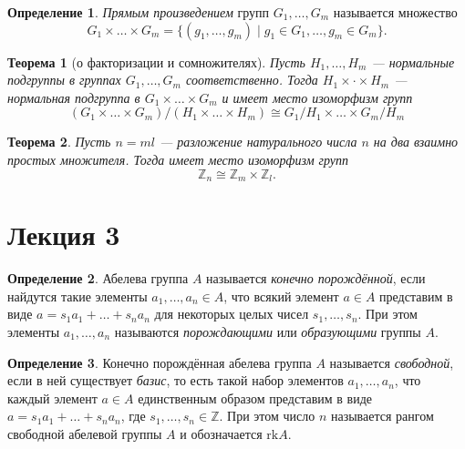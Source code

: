 \documentclass[a4paper]{article}
\theoremstyle{plain}
\newtheorem*{theorem}{Теорема}
\theoremstyle{definition}
\newtheorem{definition}{Определение}
\numberwithin{definition}{section}
\numberwithin{proposal}{section}
\newcommand{\rk}{\mathrm{rk}}
\begin{document}
\begin{definition}
\emph{Прямым произведением} групп \(G_1, \dots, G_m\) называется множество
\begin{equation*}
	G_1 \times \dots \times G_m = \{(g_1, \dots, g_m) \;|\; g_1 \in G_1, \dots, g_m \in G_m\}.
\end{equation*}
\end{definition}

\begin{theorem}[о факторизации и сомножителях]
Пусть \(H_1, \dots, H_m\) --- нормальные подгруппы в группах \(G_1, \dots, G_m\) соответственно. Тогда \(H_1 \times \cdot \times H_m\) --- нормальная подгруппа в \(G_1 \times \dots \times G_m\) и имеет место изоморфизм групп
\begin{equation*}
	(G_1 \times \dots \times G_m)/(H_1 \times \dots \times H_m) \cong G_1/H_1 \times \dots \times G_m/H_m
\end{equation*}
\end{theorem}

\begin{theorem}
Пусть \(n = ml\) --- разложение натурального числа \(n\) на два взаимно простых множителя. Тогда имеет место изоморфизм групп
\begin{equation*}
	\mathbb{Z}_n \cong \mathbb{Z}_m \times \mathbb{Z}_l.
\end{equation*}
\end{theorem}

\section{Лекция 3}

\begin{definition}
Абелева группа \(A\) называется \emph{конечно порождённой}, если найдутся такие элементы \(a_1, \dots, a_n \in A\), что всякий элемент \(a \in A\) представим в виде \(a = s_1a_1 + \dots + s_na_n\) для некоторых целых чисел \(s_1, \dots, s_n\). При этом элементы \(a_1, \dots, a_n\) называются \emph{порождающими} или \emph{образующими} группы \(A\).
\end{definition}

\begin{definition}
Конечно порождённая абелева группа \(A\) называется \emph{свободной}, если в ней существует \emph{базис}, то есть такой набор элементов \(a_1, \dots, a_n\), что каждый элемент \(a \in A\) единственным образом представим в виде \(a = s_1a_1 + \dots + s_na_n\), где \(s_1, \dots, s_n \in \mathbb{Z}\). При этом число \(n\) называется рангом свободной абелевой группы \(A\) и обозначается \(\rk A\).
\end{definition}
\end{document}
